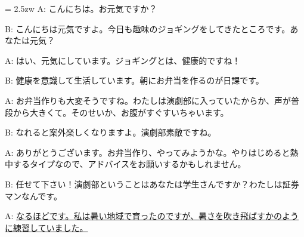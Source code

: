 \documentclass[11pt]{amsart}
\title{}
\author{}
\newenvironment{hangall}[1]{\hangindent = 2.5zw\everypar{\hangindent = 2.5zw}}{}
\begin{document}
\maketitle
\begin{hangall}{}%
A: こんにちは。お元気ですか？

B: こんにちは元気ですよ。今日も趣味のジョギングをしてきたところです。あなたは元気？

A: はい、元気にしています。ジョギングとは、健康的ですね！

B: 健康を意識して生活しています。朝にお弁当を作るのが日課です。

A: お弁当作りも大変そうですね。わたしは演劇部に入っていたからか、声が普段から大きくて。そのせいか、お腹がすぐすいちゃいます。

B: なれると案外楽しくなりますよ。演劇部素敵ですね。

A: ありがとうございます。お弁当作り、やってみようかな。やりはじめると熱中するタイプなので、アドバイスをお願いするかもしれません。

B: 任せて下さい！演劇部ということはあなたは学生さんですか？わたしは証券マンなんです。

A: \ul{なるほどです。私は暑い地域で育ったのですが、暑さを吹き飛ばすかのように練習していました。}\end{hangall}
\end{document}
